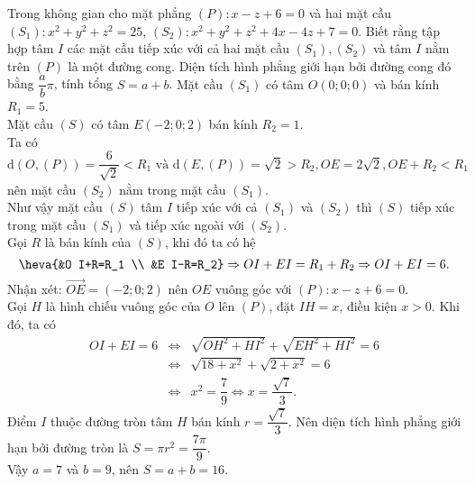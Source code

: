 \begin{ex}%
	Trong không gian cho mặt phẳng $(P)\colon x-z+6=0$ và hai mặt cầu $\left(S_1\right)\colon x^2+y^2+z^2=25$, $\left(S_2\right)\colon x^2+y^2+z^2+4 x-4 z+7=0$. Biết rằng tập hợp tâm $I$ các mặt cầu tiếp xúc với cả hai mặt cầu $\left(S_1\right),\left(S_2\right)$ và tâm $I$ nằm trên $(P)$ là một đường cong. Diện tích hình phẳng giới hạn bởi đường cong đó bằng $\dfrac{a}{b}\pi$, tính tổng $S=a+b$.
	\loigiai
	{
		Mặt cầu $\left(S_1\right)$ có tâm $O(0; 0; 0)$ và bán kính $R_1=5$. \\
		Mặt cầu $(S)$ có tâm $E(-2; 0; 2)$ bán kính $R_2=1$.\\
		Ta có 
		$$\mathrm{d}(O,(P))=\dfrac{6}{\sqrt{2}}<R_1 \text{ và } \mathrm{d}({E},(P))=\sqrt{2}>R_2, O E=2 \sqrt{2}, O E+R_2<R_1$$ 
		nên mặt cầu $\left(S_2\right)$ nằm trong mặt cầu $\left(S_1\right)$.\\ 
		Như vậy mặt cầu $(S)$ tâm $I$ tiếp xúc với cả $\left(S_1\right)$ và $\left(S_2\right)$ thì $(S)$ tiếp xúc trong mặt cầu $\left(S_1\right)$ và tiếp xúc ngoài với $\left(S_2\right)$.\\ 
		Gọi $R$ là bán kính của $(S)$, khi đó ta có hệ
		$$
		\heva{&O I+R=R_1 \\ &E I-R=R_2}\Rightarrow O I+E I=R_1+R_2 \Rightarrow O I+E I=6.
		$$ 
		Nhận xét: $\overrightarrow{O E}=(-2; 0; 2)$ nên $O E$ vuông góc với $(P)\colon x-z+6=0$.\\
		Gọi $H$ là hình chiếu vuông góc của $O$ lên $(P)$, đặt $I H=x$, điều kiện $x>0$. Khi đó, ta có
		{\allowdisplaybreaks
			\begin{eqnarray*}
				O I+E I=6 &\Leftrightarrow& \sqrt{O H^2+H I^2}+\sqrt{E H^2+H I^2}=6\\
				&\Leftrightarrow& \sqrt{18+x^2}+\sqrt{2+x^2}=6\\
				&\Leftrightarrow& x^2=\dfrac{7}{9} \Leftrightarrow x=\dfrac{\sqrt{7}}{3}.	
		\end{eqnarray*}}
		Điểm $I$ thuộc đường tròn tâm $H$ bán kính $r=\dfrac{\sqrt{7}}{3}$.
		Nên diện tích hình phẳng giới hạn bởi đường tròn là $S=\pi r^2=\dfrac{7 \pi}{9}$.\\
		Vậy $a=7$ và $b=9$, nên $S=a+b=16$.
	}
\end{ex}
